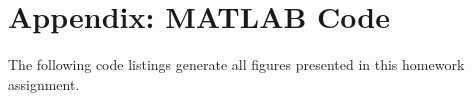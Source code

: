 \documentclass[12pt]{article}
\begin{document}
\section*{Appendix: MATLAB Code} %

The following code listings generate all figures presented in this homework assignment.


\end{document}
